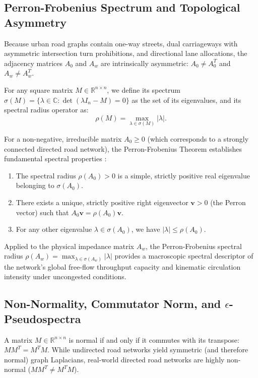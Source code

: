 \documentclass[journal]{IEEEtran}
\begin{document}
\subsection{Perron-Frobenius Spectrum and Topological Asymmetry}
Because urban road graphs contain one-way streets, dual carriageways with asymmetric intersection turn prohibitions, and directional lane allocations, the adjacency matrices $A_0$ and $A_w$ are intrinsically asymmetric: $A_0 \neq A_0^T$ and $A_w \neq A_w^T$.

For any square matrix $M \in \mathbb{R}^{n \times n}$, we define its spectrum $\sigma(M) = \{ \lambda \in \mathbb{C} : \det(\lambda I_n - M) = 0 \}$ as the set of its eigenvalues, and its spectral radius operator as:
\begin{equation}
\rho(M) = \max_{\lambda \in \sigma(M)} |\lambda|.
\label{eq:spectral_radius_def}
\end{equation}

For a non-negative, irreducible matrix $A_0 \ge 0$ (which corresponds to a strongly connected directed road network), the Perron-Frobenius Theorem establishes fundamental spectral properties \cite{Perron1907, Frobenius1912, Cvetkovic1980}:
\begin{enumerate}
    \item The spectral radius $\rho(A_0) > 0$ is a simple, strictly positive real eigenvalue belonging to $\sigma(A_0)$.
    \item There exists a unique, strictly positive right eigenvector $\mathbf{v} > 0$ (the Perron vector) such that $A_0 \mathbf{v} = \rho(A_0) \mathbf{v}$.
    \item For any other eigenvalue $\lambda \in \sigma(A_0)$, we have $|\lambda| \le \rho(A_0)$.
\end{enumerate}

Applied to the physical impedance matrix $A_w$, the Perron-Frobenius spectral radius $\rho(A_w) = \max_{\lambda \in \sigma(A_w)} |\lambda|$ provides a macroscopic spectral descriptor of the network's global free-flow throughput capacity and kinematic circulation intensity under uncongested conditions.

\subsection{Non-Normality, Commutator Norm, and $\epsilon$-Pseudospectra}
A matrix $M \in \mathbb{R}^{n \times n}$ is normal if and only if it commutes with its transpose: $M M^T = M^T M$. While undirected road networks yield symmetric (and therefore normal) graph Laplacians, real-world directed road networks are highly non-normal ($M M^T \neq M^T M$).
\end{document}
